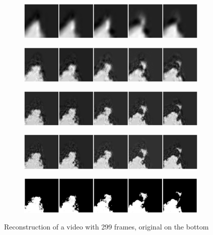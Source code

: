 \documentclass{article}
\begin{document}
\begin{figure}
	\centering
	\begin{subfigure}{\textwidth}
		\includegraphics[width=\textwidth]{visuals/Underconstrained_flicker_g1_c111_10.png}
	\end{subfigure}
	\begin{subfigure}{\textwidth}
		\includegraphics[width=\textwidth]{visuals/Underconstrained_flicker_g1_c111_50.png}
	\end{subfigure}
	\begin{subfigure}{\textwidth}
		\includegraphics[width=\textwidth]{visuals/Underconstrained_flicker_g1_c111_100.png}
	\end{subfigure}
	\begin{subfigure}{\textwidth}
		\includegraphics[width=\textwidth]{visuals/Underconstrained_flicker_g1_c111_128.png}
	\end{subfigure}
	\begin{subfigure}{\textwidth}
		\includegraphics[width=\textwidth]{visuals/Underconstrained_flicker_g1_c111.png}
	\end{subfigure}
	\caption{Reconstruction of a video with 299 frames, original on the bottom}
	\label{fig:reconstruction-3}
\end{figure}
\end{document}

